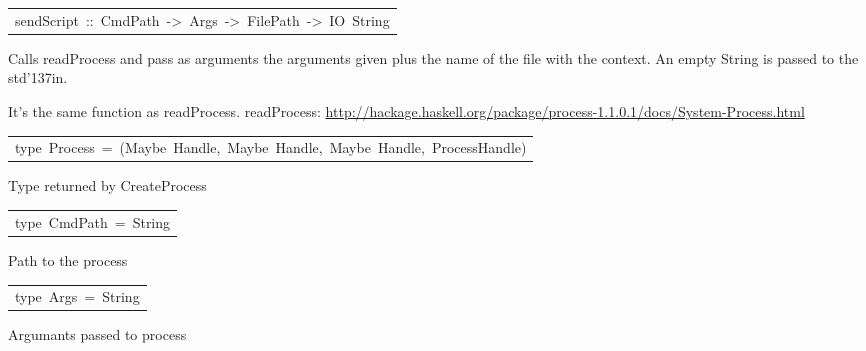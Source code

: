 \begin{haddockdesc}
\item[\begin{tabular}{@{}l}
sendScript\ ::\ CmdPath\ ->\ Args\ ->\ FilePath\ ->\ IO\ String
\end{tabular}]\haddockbegindoc
Calls readProcess and pass as arguments the arguments given plus the name of
the file with the context.
An empty String is passed to the std{\char '137}in.
\par
It's the same function as readProcess.
readProcess:
\url{http://hackage.haskell.org/package/process-1.1.0.1/docs/System-Process.html}
\par

\end{haddockdesc}
\begin{haddockdesc}
\item[\begin{tabular}{@{}l}
type\ Process\ =\ (Maybe\ Handle,\ Maybe\ Handle,\ Maybe\ Handle,\ ProcessHandle)
\end{tabular}]\haddockbegindoc
Type returned by CreateProcess
\par

\end{haddockdesc}
\begin{haddockdesc}
\item[\begin{tabular}{@{}l}
type\ CmdPath\ =\ String
\end{tabular}]\haddockbegindoc
Path to the process
\par

\end{haddockdesc}
\begin{haddockdesc}
\item[\begin{tabular}{@{}l}
type\ Args\ =\ {\char 91}String{\char 93}
\end{tabular}]\haddockbegindoc
Argumants passed to process
\par

\end{haddockdesc}